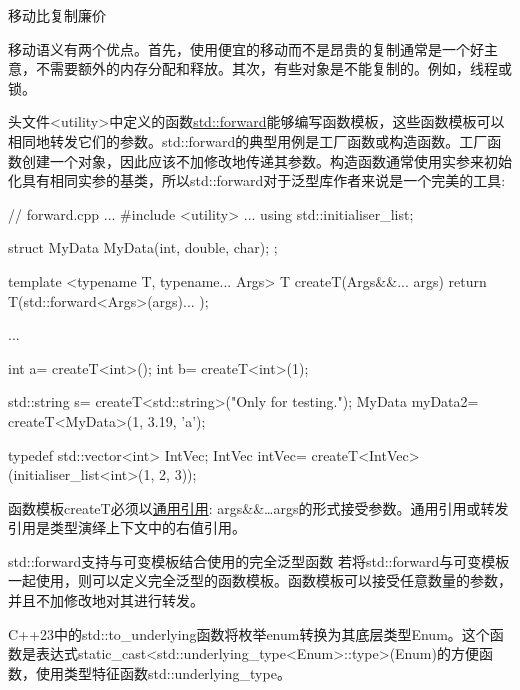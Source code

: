 \begin{myTip}{移动比复制廉价}
	
移动语义有两个优点。首先，使用便宜的移动而不是昂贵的复制通常是一个好主意，不需要额外的内存分配和释放。其次，有些对象是不能复制的。例如，线程或锁。

\end{myTip}


头文件<utility>中定义的函数\href{http://en.cppreference.com/w/cpp/utility/forward}{std::forward}能够编写函数模板，这些函数模板可以相同地转发它们的参数。std::forward的典型用例是工厂函数或构造函数。工厂函数创建一个对象，因此应该不加修改地传递其参数。构造函数通常使用实参来初始化具有相同实参的基类，所以std::forward对于泛型库作者来说是一个完美的工具:


\begin{cpp}
// forward.cpp
...
#include <utility>
...
using std::initialiser_list;

struct MyData{
	MyData(int, double, char){};
};

template <typename T, typename... Args>
T createT(Args&&... args){
	return T(std::forward<Args>(args)... );
}

...

int a= createT<int>();
int b= createT<int>(1);

std::string s= createT<std::string>("Only for testing.");
MyData myData2= createT<MyData>(1, 3.19, 'a');

typedef std::vector<int> IntVec;
IntVec intVec= createT<IntVec>(initialiser_list<int>({1, 2, 3}));
\end{cpp}

函数模板createT必须以\href{https://isocpp.org/blog/2012/11/universal-references-in-c11-scott-meyers}{通用引用}: args\&\&…args的形式接受参数。通用引用或转发引用是类型演绎上下文中的右值引用。

\begin{myTip}{std::forward支持与可变模板结合使用的完全泛型函数}
若将std::forward与可变模板一起使用，则可以定义完全泛型的函数模板。函数模板可以接受任意数量的参数，并且不加修改地对其进行转发。
\end{myTip}


C++23中的std::to\_underlying函数将枚举enum转换为其底层类型Enum。这个函数是表达式static\_cast<std::underlying\_type<Enum>::type>(Enum)的方便函数，使用类型特征函数std::underlying\_type。


